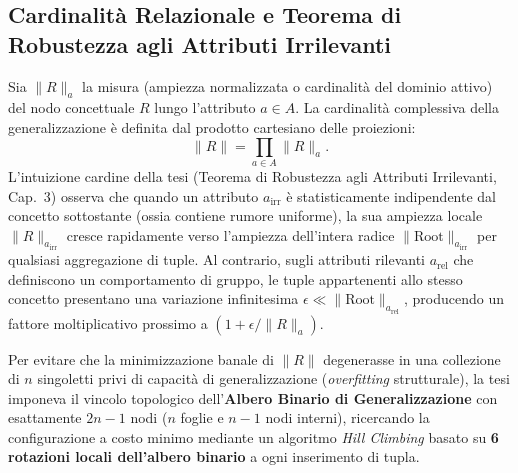 \documentclass[10pt,a4paper]{article}
\begin{document}
\subsection{Cardinalit\`a Relazionale e Teorema di Robustezza agli Attributi Irrilevanti}
Sia $\|R\|_a$ la misura (ampiezza normalizzata o cardinalit\`a del dominio attivo) del nodo concettuale $R$ lungo l'attributo $a \in A$. La cardinalit\`a complessiva della generalizzazione \`e definita dal prodotto cartesiano delle proiezioni:
\begin{equation}
\|R\| = \prod_{a \in A} \|R\|_a.
\label{eq:thesis_cardinality}
\end{equation}
L'intuizione cardine della tesi (Teorema di Robustezza agli Attributi Irrilevanti, Cap.~3) osserva che quando un attributo $a_{\text{irr}}$ \`e statisticamente indipendente dal concetto sottostante (ossia contiene rumore uniforme), la sua ampiezza locale $\|R\|_{a_{\text{irr}}}$ cresce rapidamente verso l'ampiezza dell'intera radice $\|\text{Root}\|_{a_{\text{irr}}}$ per qualsiasi aggregazione di tuple. Al contrario, sugli attributi rilevanti $a_{\text{rel}}$ che definiscono un comportamento di gruppo, le tuple appartenenti allo stesso concetto presentano una variazione infinitesima $\epsilon \ll \|\text{Root}\|_{a_{\text{rel}}}$, producendo un fattore moltiplicativo prossimo a $(1 + \epsilon / \|R\|_a)$.

Per evitare che la minimizzazione banale di $\|R\|$ degenerasse in una collezione di $n$ singoletti privi di capacit\`a di generalizzazione (\textit{overfitting} strutturale), la tesi imponeva il vincolo topologico dell'\textbf{Albero Binario di Generalizzazione} con esattamente $2n - 1$ nodi ($n$ foglie e $n-1$ nodi interni), ricercando la configurazione a costo minimo mediante un algoritmo \textit{Hill Climbing} basato su \textbf{6 rotazioni locali dell'albero binario} a ogni inserimento di tupla.
\end{document}

